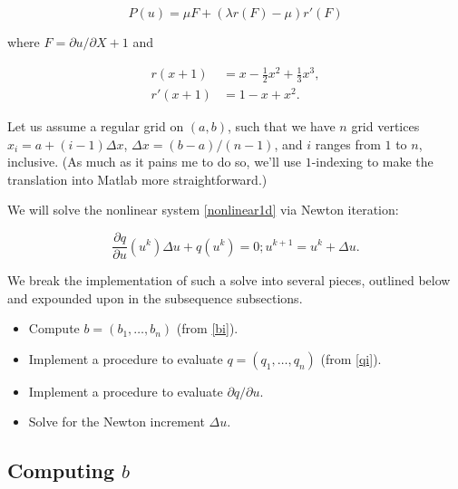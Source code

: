 \documentclass{article}
\begin{document}
\begin{equation}\label{P}
P(u) = \mu F + \left( \lambda r(F) - \mu \right) r'(F)
\end{equation}

where \(F = \partial u / \partial X + 1\) and

\begin{subequations}
\begin{align}
r(x + 1) & = x - \frac{1}{2} x^2 + \frac{1}{3} x^3, \\
r'(x + 1) & = 1 - x + x^2.
\end{align}
\end{subequations}

Let us assume a regular grid on \((a,b)\), such that we have \(n\) grid vertices \(x_i = a + (i - 1) \Delta x\), \(\Delta x = (b - a)/(n - 1)\), and \(i\) ranges from \(1\) to \(n\), inclusive.  (As much as it pains me to do so, we'll use \(1\)-indexing to make the translation into Matlab more straightforward.)

We will solve the nonlinear system \eqref{nonlinear1d} via Newton iteration:

\begin{subequations}
\begin{equation}
\frac{\partial q}{\partial u} \left( u^k \right) \Delta u + q \left( u^k \right) = 0;
\end{equation}
\begin{equation}
u^{k+1} = u^k + \Delta u.
\end{equation}
\end{subequations}

We break the implementation of such a solve into several pieces, outlined below and expounded upon in the subsequence subsections.

\begin{itemize}
\item Compute \(b = \left( b_1, \dotsc, b_n \right)\) (from \eqref{bi}).
\item Implement a procedure to evaluate \(q = \left( q_1, \dotsc, q_n \right)\) (from \eqref{qi}).
\item Implement a procedure to evaluate \(\partial q / \partial u\).
\item Solve for the Newton increment \(\Delta u\).
\end{itemize}

\subsection{Computing \(b\)}
\end{document}
